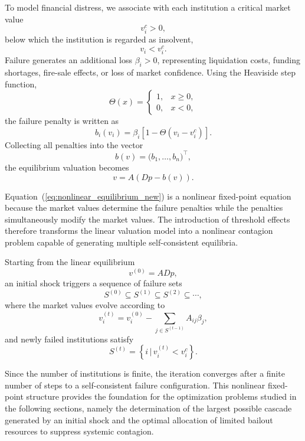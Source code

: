 \documentclass[aps,reprint,superscriptaddress,pra]{revtex4-2}
\begin{document}
To model financial distress, we associate with each institution a critical market value
\begin{equation}
v_i^{c}>0,
\end{equation}
below which the institution is regarded as insolvent,
\begin{equation}
v_i<v_i^{c}.
\label{eq:failure_condition_new}
\end{equation}
Failure generates an additional loss
$\beta_i>0$,
representing liquidation costs, funding shortages, fire-sale effects, or loss of market confidence. \cite{orus2019forecasting}
Using the Heaviside step function,
\begin{equation}
\Theta(x)=
\begin{cases}
1,&x\ge0,\\
0,&x<0,
\end{cases}
\end{equation}
the failure penalty is written as
\begin{equation}
b_i(v_i)
=
\beta_i
\left[
1-\Theta(v_i-v_i^{c})
\right].
\end{equation}
Collecting all penalties into the vector
\[
b(v)=\bigl(b_1,\ldots,b_n\bigr)^{\top},
\]
the equilibrium valuation becomes
\begin{equation}
v
=
A\left(Dp-b(v)\right).
\label{eq:nonlinear_equilibrium_new}
\end{equation}

Equation~(\ref{eq:nonlinear_equilibrium_new}) is a nonlinear fixed-point equation because the market values determine the failure penalties while the penalties simultaneously modify the market values. The introduction of threshold effects therefore transforms the linear valuation model into a nonlinear contagion problem capable of generating multiple self-consistent equilibria.

Starting from the linear equilibrium
\[
v^{(0)}=ADp,
\]
an initial shock triggers a sequence of failure sets
\[
S^{(0)}
\subseteq
S^{(1)}
\subseteq
S^{(2)}
\subseteq
\cdots,
\]
where the market values evolve according to
\begin{equation}
v_i^{(t)}
=
v_i^{(0)}
-
\sum_{j\in S^{(t-1)}}A_{ij}\beta_j,
\label{eq:cascade_iteration_new}
\end{equation}
and newly failed institutions satisfy
\begin{equation}
S^{(t)}
=
\left\{
i\,\big|\,
v_i^{(t)}<v_i^{c}
\right\}.
\label{eq:cascade_set_new}
\end{equation}

Since the number of institutions is finite, the iteration converges after a finite number of steps to a self-consistent failure configuration. This nonlinear fixed-point structure provides the foundation for the optimization problems studied in the following sections, namely the determination of the largest possible cascade generated by an initial shock and the optimal allocation of limited bailout resources to suppress systemic contagion.
\end{document}
